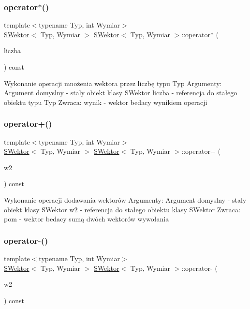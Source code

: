 \subsubsection{\texorpdfstring{operator$\ast$()}{operator*()}\hspace{0.1cm}{\footnotesize\ttfamily [2/2]}}
{\footnotesize\ttfamily template$<$typename Typ, int Wymiar$>$ \\
\hyperlink{classSWektor}{S\+Wektor}$<$ Typ, Wymiar $>$ \hyperlink{classSWektor}{S\+Wektor}$<$ Typ, Wymiar $>$\+::operator$\ast$ (\begin{DoxyParamCaption}\item[{Typ}]{liczba }\end{DoxyParamCaption}) const}

Wykonanie operacji mnożenia wektora przez liczbę typu Typ Argumenty\+: Argument domyslny -\/ staly obiekt klasy \hyperlink{classSWektor}{S\+Wektor} liczba -\/ referencja do stałego obiektu typu Typ Zwraca\+: wynik -\/ wektor bedacy wynikiem operacji \mbox{\label{classSWektor_a088f294837df1f61cb577c26646ba76a}} 
\subsubsection{\texorpdfstring{operator+()}{operator+()}}
{\footnotesize\ttfamily template$<$typename Typ, int Wymiar$>$ \\
\hyperlink{classSWektor}{S\+Wektor}$<$ Typ, Wymiar $>$ \hyperlink{classSWektor}{S\+Wektor}$<$ Typ, Wymiar $>$\+::operator+ (\begin{DoxyParamCaption}\item[{const \hyperlink{classSWektor}{S\+Wektor}$<$ Typ, Wymiar $>$ \&}]{w2 }\end{DoxyParamCaption}) const}

Wykonanie operacji dodawania wektorów Argumenty\+: Argument domyslny -\/ staly obiekt klasy \hyperlink{classSWektor}{S\+Wektor} w2 -\/ referencja do stałego obiektu klasy \hyperlink{classSWektor}{S\+Wektor} Zwraca\+: pom -\/ wektor bedacy sumą dwóch wektorów wywołania \mbox{\label{classSWektor_ad6edecba069a5fa43685eae4de64126a}} 
\subsubsection{\texorpdfstring{operator-\/()}{operator-()}}
{\footnotesize\ttfamily template$<$typename Typ, int Wymiar$>$ \\
\hyperlink{classSWektor}{S\+Wektor}$<$ Typ, Wymiar $>$ \hyperlink{classSWektor}{S\+Wektor}$<$ Typ, Wymiar $>$\+::operator-\/ (\begin{DoxyParamCaption}\item[{const \hyperlink{classSWektor}{S\+Wektor}$<$ Typ, Wymiar $>$ \&}]{w2 }\end{DoxyParamCaption}) const}

